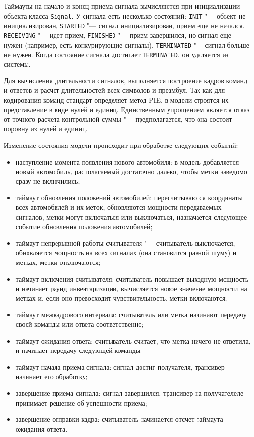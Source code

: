 Таймауты на начало и конец приема сигнала вычисляются при инициализации объекта класса \texttt{Signal}. У сигнала есть несколько состояний: \texttt{INIT} "--- объект не инициализирован, \texttt{STARTED} "--- сигнал инициализирован, прием еще не начался, \texttt{RECEIVING} "--- идет прием, \texttt{FINISHED} "--- прием завершился, но сигнал еще нужен (например, есть конкурирующие сигналы), \texttt{TERMINATED} "--- сигнал больше не нужен. Когда состояние сигнала достигает \texttt{TERMINATED}, он удаляется из системы.

Для вычисления длительности сигналов, выполняется построение кадров команд и ответов и расчет длительностей всех символов и преамбул. Так как для кодирования команд стандарт определяет метод PIE, в модели строятся их представление в виде нулей и единиц. Единственным упрощением является отказ от точного расчета контрольной суммы "--- предполагается, что она состоит поровну из нулей и единиц.

Изменение состояния модели происходит при обработке следующих событий:

\begin{itemize}
	\item наступление момента появления нового автомобиля: в модель добавляется новый автомобиль, располагаемый достаточно далеко, чтобы метки заведомо сразу не включились;
	\item таймаут обновления положений автомобилей: пересчитываются координаты всех автомобилей и их меток, обновляются мощности передаваемых сигналов, метки могут включаться или выключаться, назначается следующее событие обновления положения автомобилей;
	\item таймаут непрерывной работы считывателя "--- считыватель выключается, обновляется мощность на всех сигналах (она становится равной шуму) и метках, метки отключаются;
	\item таймаут включения считывателя: считыватель повышает выходную мощность и начинает раунд инвентаризации, вычисляется новое значение мощности на метках и, если оно превосходит чувствительность, метки включаются;
	\item таймаут межкадрового интервала: считыватель или метка начинают передачу своей команды или ответа соответственно;
	\item таймаут ожидания ответа: считыватель считает, что метка ничего не ответила, и начинает передачу следующей команды;
	\item таймаут начала приема сигнала: сигнал достиг получателя, трансивер начинает его обработку;
	\item завершение приема сигнала: сигнал завершился, трансивер на получателеле принимает решение об успешности приема;
	\item завершение отправки кадра: считыватель начинается отсчет таймаута ожидания ответа.
\end{itemize}

